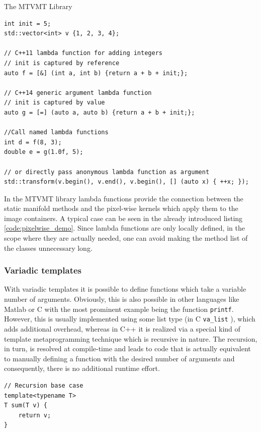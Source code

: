 \begin{chapter}{The MTVMT Library}
\cppinline
\begin{lstlisting}[label=code:lambdafun,caption={Lambda functions}]
int init = 5;
std::vector<int> v {1, 2, 3, 4};

// C++11 lambda function for adding integers
// init is captured by reference
auto f = [&] (int a, int b) {return a + b + init;};

// C++14 generic argument lambda function
// init is captured by value
auto g = [=] (auto a, auto b) {return a + b + init;};

//Call named lambda functions
int d = f(8, 3);
double e = g(1.0f, 5);

// or directly pass anonymous lambda function as argument
std::transform(v.begin(), v.end(), v.begin(), [] (auto x) { ++x; });
\end{lstlisting}

In the MTVMT library lambda functions provide the connection between the static manifold methods and the pixel-wise kernels which apply them to the image containers.
A typical case can be seen in the already introduced listing \ref{code:pixelwise_demo}. Since lambda functions are only locally defined, in the scope where they are actually needed,
one can avoid making the method list of the classes unnecessary long.

\subsubsection{Variadic templates} %
\label{ssub:Variadic templates}
With variadic templates it is possible to define functions which take a variable number of arguments. Obviously, this is also possible in other languages like Matlab or
C with the most prominent example being the function \texttt{printf}. However, this is usually implemented using some list type (in C \texttt{va\_list} ), which adds additional 
overhead, whereas in C++ it is realized via a special kind of template metaprogramming technique which is recursive in nature. The recursion, in turn, is resolved at compile-time
and leads to code that is actually equivalent to manually defining a function with the desired number of arguments and consequently, there is no additional runtime effort.\\

\cppinline
\begin{lstlisting}[label=code:variadic,caption={Variadic template example}]
// Recursion base case
template<typename T>
T sum(T v) {
    return v;
}


\end{lstlisting}
\end{chapter}
